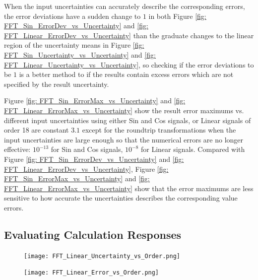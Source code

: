 \documentclass[twoside]{article}
\numberwithin{equation}{section}
\begin{document}
When the input uncertainties can accurately describe the corresponding errors, the error deviations have a sudden change to $1$ in both Figure \ref{fig: FFT_Sin_ErrorDev_vs_Uncertainty} and \ref{fig: FFT_Linear_ErrorDev_vs_Uncertainty} than the graduate changes to the linear region of the uncertainty means in Figure \ref{fig: FFT_Sin_Uncertainty_vs_Uncertainty} and \ref{fig: FFT_Linear_Uncertainty_vs_Uncertainty}, so checking if the error deviations to be $1$ is a better method to if the results contain excess errors which are not specified by the result uncertainty.

Figure \ref{fig: FFT_Sin_ErrorMax_vs_Uncertainty} and \ref{fig: FFT_Linear_ErrorMax_vs_Uncertainty} show the result error maximums vs. different input uncertainties using either Sin and Cos signals, or Linear signals of order 18 are constant $3.1$ except for the roundtrip transformations when the input uncertainties are large enough so that the numerical errors are no longer effective: $10^{-13}$ for Sin and Cos signals, $10^{-8}$ for Linear signals.
Compared with Figure \ref{fig: FFT_Sin_ErrorDev_vs_Uncertainty} and \ref{fig: FFT_Linear_ErrorDev_vs_Uncertainty}, Figure \ref{fig: FFT_Sin_ErrorMax_vs_Uncertainty} and \ref{fig: FFT_Linear_ErrorMax_vs_Uncertainty} show that the error maximums are less sensitive to how accurate the uncertainties describes the corresponding value errors.







\subsection{Evaluating Calculation Responses}

\begin{figure}[p]
\centering
\texttt{[image: FFT\_Linear\_Uncertainty\_vs\_Order.png]} 
\label{fig: FFT_Linear_Uncertainty_vs_Order}
\end{figure}

\begin{figure}[p]
\centering
\texttt{[image: FFT\_Linear\_Error\_vs\_Order.png]} 
\label{fig: FFT_Linear_Error_vs_Order}
\end{figure}
\end{document}
